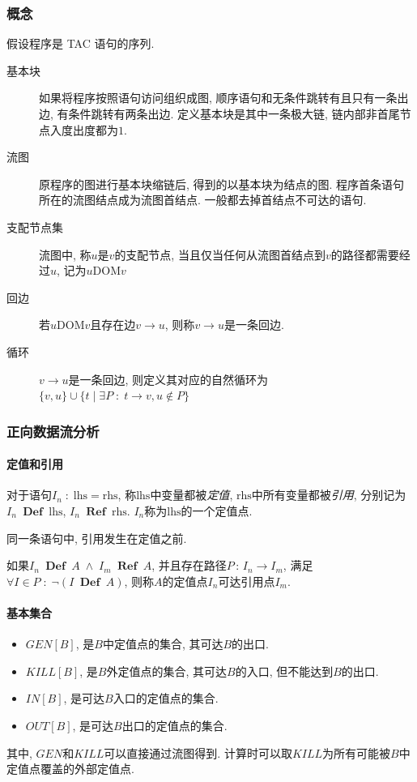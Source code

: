 \documentclass{ctexart}
\DeclareMathOperator{\Def}{\;\mathbf{Def}\;}
\DeclareMathOperator{\Ref}{\;\mathbf{Ref}\;}
\begin{document}
\subsubsection{概念}
    假设程序是 TAC 语句的序列. 
    \begin{description}
        \item[基本块] 如果将程序按照语句访问组织成图,
            顺序语句和无条件跳转有且只有一条出边,
            有条件跳转有两条出边.
            定义基本块是其中一条极大链, 链内部非首尾节点入度出度都为$1$.
        \item[流图] 原程序的图进行基本块缩链后, 得到的以基本块为结点的图.
            程序首条语句所在的流图结点成为流图首结点.
            一般都去掉首结点不可达的语句.
        \item[支配节点集] 流图中, 称$u$是$v$的支配节点, 
            当且仅当任何从流图首结点到$v$的路径都需要经过$u$, 记为$u \mathrm{DOM} v$
        \item[回边] 若$u \mathrm{DOM} v$且存在边$v\to u$, 则称$v\to u$是一条回边.
        \item[循环] $v\to u$是一条回边,
            则定义其对应的自然循环为
            $ \{v, u\} \cup \{ t \;|\; \exists P\;:\; t\to v, u \not\in P\} $
    \end{description}

\subsubsection{正向数据流分析}
\paragraph{定值和引用} 
    对于语句$I_n \;:\; \mathrm{lhs} = \mathrm{rhs}$,
    称$\mathrm{lhs}$中变量都被\emph{定值},
    $\mathrm{rhs}$中所有变量都被\emph{引用},
    分别记为$I_n \Def \mathrm{lhs}$,
        $I_n \Ref \mathrm{rhs}$.
    $I_n$称为$\mathrm{lhs}$的一个定值点.\par
    同一条语句中, 引用发生在定值之前.\par
    如果$I_n \Def A \;\land\; I_m \Ref A$,
    并且存在路径$P\,:\,I_n\to I_m$,
    满足$\forall I\in P\;:\; \neg(I \Def A)$,
    则称$A$的定值点$I_n$可达引用点$I_m$.
\paragraph{基本集合}
    \begin{itemize}
        \item $GEN[B]$, 是$B$中定值点的集合, 其可达$B$的出口.
        \item $KILL[B]$, 是$B$外定值点的集合, 其可达$B$的入口, 但不能达到$B$的出口.
        \item $IN[B]$, 是可达$B$入口的定值点的集合.
        \item $OUT[B]$, 是可达$B$出口的定值点的集合.
    \end{itemize}
    其中, $GEN$和$KILL$可以直接通过流图得到.
    计算时可以取$KILL$为所有可能被$B$中定值点覆盖的外部定值点.
\end{document}
